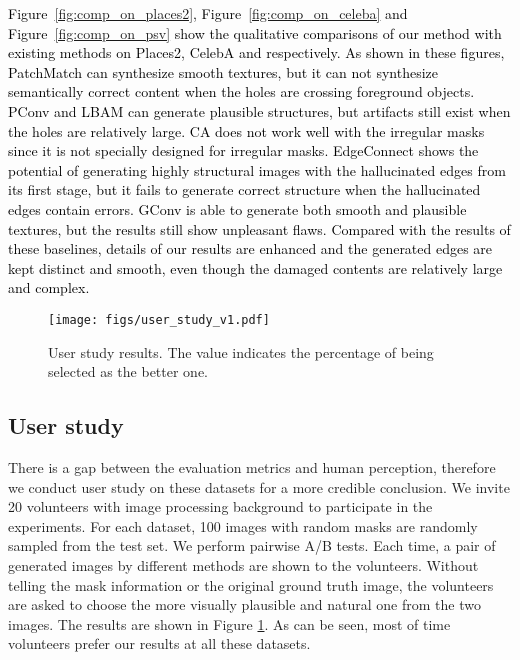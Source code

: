 \documentclass[journal]{IEEEtran}
\begin{document}
\textcolor{black}{    
Figure~\ref{fig:comp_on_places2}, Figure~\ref{fig:comp_on_celeba} and Figure~\ref{fig:comp_on_psv} show the qualitative comparisons of our method with existing methods on Places2, CelebA and {\color{black}{Paris StreetView}} respectively. As shown in these figures, PatchMatch can synthesize smooth textures, but it can not synthesize semantically correct content when the holes are crossing foreground objects. PConv and LBAM can generate plausible structures, but artifacts still exist when the holes are relatively large. 
CA does not work well with the irregular masks since it is not specially designed for irregular masks.
EdgeConnect shows the potential of generating highly structural images with the hallucinated edges from its first stage, but it fails to generate correct structure when the hallucinated edges contain errors. 
GConv is able to generate both smooth and plausible textures, but the results still show unpleasant flaws. 
Compared with the results of these baselines, details of our results are enhanced and the generated edges are kept distinct and smooth, even though the damaged contents are relatively large and complex. {\color{black}{We contribute this to the characteristic of our method,
which utilizes the mask awareness and refines the result progressively in a cascade way. With mask awareness, our model can learn to generate better features representations to denote the image content for decoding. Besides, at the decoding phase, PN is leverage to eliminate ``covariant shift'' when normalizing the features. Therefore, the features of hole regions at decoder is as effective and homogeneous as the non-hole regions. Further combining refinement decoders, the results become more plausible.}}
}

\begin{figure}[!h]
\centering
\texttt{[image: figs/user\_study\_v1.pdf]}
\caption{User study results. The value indicates the percentage of being selected as the better one.}
\label{fig:user_study}
\end{figure}
\subsection{User study}
There is a gap between the evaluation metrics and human perception,
therefore we conduct user study on these datasets for a more credible conclusion. We invite 20 volunteers with image processing background to participate in the experiments.
For each dataset, 100 images with random masks are randomly sampled from the test set. We perform pairwise A/B tests. Each time, a pair of generated images by different methods are shown to the volunteers. Without telling the mask information or the original ground truth image, the volunteers are asked to choose the more visually plausible and natural one from the two images. The results are shown in Figure \ref{fig:user_study}. As can be seen, most of time volunteers prefer our results at all these datasets. 
\end{document}
